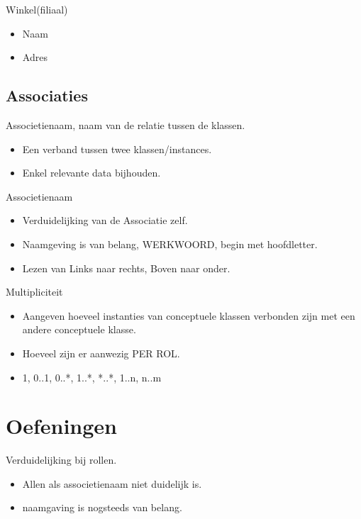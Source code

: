 \documentclass{article}
\begin{document}
Winkel(filiaal)
\begin{itemize}
\item Naam
\item Adres
\end{itemize}

\subsection{Associaties}
Associetienaam, naam van de relatie tussen de klassen.
\begin{itemize}
\item Een verband tussen twee klassen/instances.
\item Enkel relevante data bijhouden.
\end{itemize}

Associetienaam
\begin{itemize}
\item Verduidelijking van de Associatie zelf.
\item Naamgeving is van belang, WERKWOORD, begin met hoofdletter.
\item Lezen van Links naar rechts, Boven naar onder.
\end{itemize}

Multipliciteit
\begin{itemize}
\item Aangeven hoeveel instanties van conceptuele klassen verbonden zijn met een andere conceptuele klasse.	
\item Hoeveel zijn er aanwezig PER ROL.
\item 1, 0..1, 0..*, 1..*, *..*, 1..n, n..m
\end{itemize}

\section{Oefeningen}
Verduidelijking bij rollen.
\begin{itemize}
\item Allen als associetienaam niet duidelijk is.
\item naamgaving is nogsteeds van belang.
\end{itemize}
\end{document}
